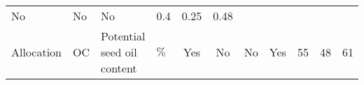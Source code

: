 \documentclass[a4paper]{article}
\begin{document}
\begin{longtable}[]{@{}llllccccrrr@{}}
\begin{minipage}[t]{0.08\columnwidth}
No\strut
\end{minipage} & \begin{minipage}[t]{0.05\columnwidth}\centering\strut
No\strut
\end{minipage} & \begin{minipage}[t]{0.04\columnwidth}\centering\strut
No\strut
\end{minipage} & \begin{minipage}[t]{0.04\columnwidth}\raggedleft\strut
0.4\strut
\end{minipage} & \begin{minipage}[t]{0.04\columnwidth}\raggedleft\strut
0.25\strut
\end{minipage} & \begin{minipage}[t]{0.04\columnwidth}\raggedleft\strut
0.48\strut
\end{minipage}\tabularnewline
\begin{minipage}[t]{0.08\columnwidth}\raggedright\strut
Allocation\strut
\end{minipage} & \begin{minipage}[t]{0.05\columnwidth}\raggedright\strut
OC\strut
\end{minipage} & \begin{minipage}[t]{0.19\columnwidth}\raggedright\strut
Potential seed oil content\strut
\end{minipage} & \begin{minipage}[t]{0.06\columnwidth}\raggedright\strut
\(\%\)\strut
\end{minipage} & \begin{minipage}[t]{0.06\columnwidth}\centering\strut
Yes\strut
\end{minipage} & \begin{minipage}[t]{0.08\columnwidth}\centering\strut
No\strut
\end{minipage} & \begin{minipage}[t]{0.05\columnwidth}\centering\strut
No\strut
\end{minipage} & \begin{minipage}[t]{0.04\columnwidth}\centering\strut
Yes\strut
\end{minipage} & \begin{minipage}[t]{0.04\columnwidth}\raggedleft\strut
55\strut
\end{minipage} & \begin{minipage}[t]{0.04\columnwidth}\raggedleft\strut
48\strut
\end{minipage} & \begin{minipage}[t]{0.04\columnwidth}\raggedleft\strut
61\strut
\end{minipage}\tabularnewline
\bottomrule
\end{longtable}
\end{document}
